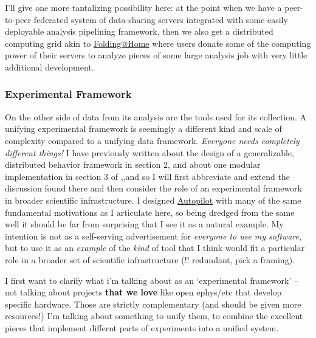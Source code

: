 \documentclass{article}
\begin{document}
I'll give one more tantalizing possibility here: at the point when we
have a peer-to-peer federated system of data-sharing servers integrated
with some easily deployable analysis pipelining framework, then we also
get a distributed computing grid akin to
\href{https://foldingathome.org/}{Folding@Home} where users donate some
of the computing power of their servers to analyze pieces of some large
analysis job with very little additional development.

\hypertarget{experimental-framework}{%
\subsubsection{Experimental Framework}\label{experimental-framework}}

On the other side of data from its analysis are the tools used for its
collection. A unifying experimental framework is seemingly a different
kind and scale of complexity compared to a unifying data framework.
\emph{Everyone needs completely different things!} I have previously
written about the design of a generalizable, distributed behavior
framework in section 2, and about one modular implementation in section
3 of \cite{saundersAutopilotAutomatingBehavioral2019},,and so I
will first abbreviate and extend the discussion found there and then
consider the role of an experimental framework in broader scientific
infrastructure. I designed
\href{https://docs.auto-pi-lot.com}{Autopilot} with many of the same
fundamental motivations as I articulate here, so being dredged from the
same well it should be far from surprising that I see it as a natural
example. My intention is not as a self-serving advertisement for
\emph{everyone to use my software,} but to use it as an \emph{example}
of the \emph{kind} of tool that I think would fit a particular role in a
broader set of scientific infrastructure (!! redundant, pick a framing).

I first want to clarify what i'm talking about as an `experimental
framework' -- not talking about projects \textbf{that we love} like open
ephys/etc that develop specific hardware. Those are strictly
complementary (and should be given more resources!) I'm talking about
something to unify them, to combine the excellent pieces that implement
differnt parts of experiments into a unified system.
\end{document}
